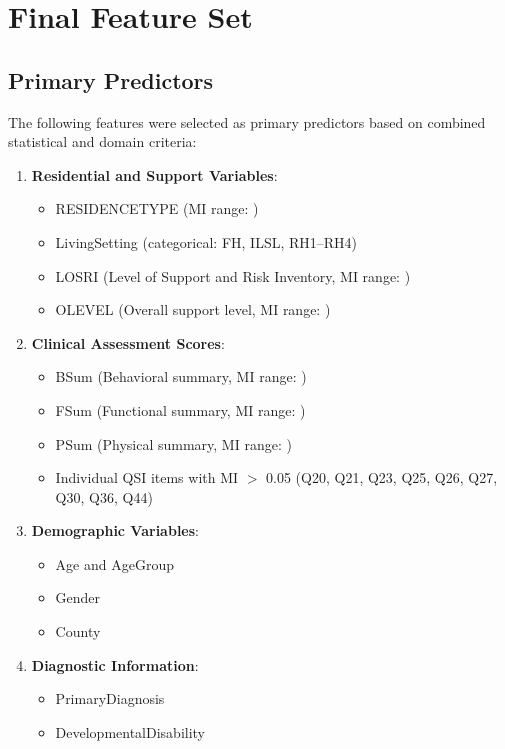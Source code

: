\section{Final Feature Set}
\label{sec:final-feature-set}

\subsection{Primary Predictors}
\label{subsec:primary-predictors}

The following features were selected as primary predictors based on combined statistical and domain criteria:

\begin{enumerate}
    \item \textbf{Residential and Support Variables}:
    \begin{itemize}
        \item RESIDENCETYPE (MI range: \FSRangeMIRESIDENCETYPE)
        \item LivingSetting (categorical: FH, ILSL, RH1--RH4)
        \item LOSRI (Level of Support and Risk Inventory, MI range: \FSRangeMILOSRI)
        \item OLEVEL (Overall support level, MI range: \FSRangeMIOLEVEL)
    \end{itemize}
    
    \item \textbf{Clinical Assessment Scores}:
    \begin{itemize}
        \item BSum (Behavioral summary, MI range: \FSRangeMIBSum)
        \item FSum (Functional summary, MI range: \FSRangeMIFSum)
        \item PSum (Physical summary, MI range: \FSRangeMIPSum)
        \item Individual QSI items with MI $>$ 0.05 (Q20, Q21, Q23, Q25, Q26, Q27, Q30, Q36, Q44)
    \end{itemize}
    
    \item \textbf{Demographic Variables}:
    \begin{itemize}
        \item Age and AgeGroup
        \item Gender
        \item County
    \end{itemize}
    
    \item \textbf{Diagnostic Information}:
    \begin{itemize}
        \item PrimaryDiagnosis
        \item DevelopmentalDisability
    \end{itemize}
\end{enumerate}

